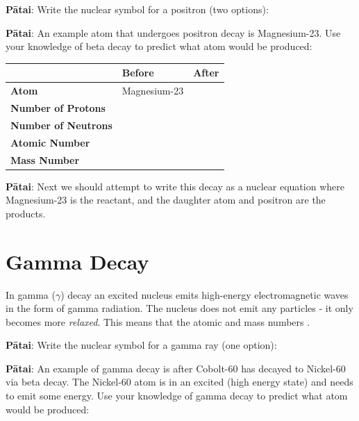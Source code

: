 \documentclass[12pt]{report}
\makeatletter
\DeclareRobustCommand{\fillinspace}[1]{%
\ifthenelse{\boolean{@answer}}{\textcolor{red}{#1}}{\phantom{#1}}%
}
\makeatother
\begin{document}
{\noindent\textbf{Pātai}: Write the nuclear symbol for a positron (two options):
\vspace{1.5cm}

\noindent\textbf{Pātai}: An example atom that undergoes positron decay is Magnesium-23. Use your knowledge of beta decay to predict what atom would be produced:

\begin{table}[ht]
\centering
\begin{tabular}{|l|p{3cm}|p{3cm}|}
\hline
                            & \textbf{Before} & \textbf{After} \\ \hline
\textbf{Atom}               & Magnesium-23    &                \\ \hline
\textbf{Number of Protons}  &                 &                \\ \hline
\textbf{Number of Neutrons} &                 &                \\ \hline
\textbf{Atomic Number}      &                 &                \\ \hline
\textbf{Mass Number}        &                 &                \\ \hline
\end{tabular}
\end{table}

\noindent\textbf{Pātai}: Next we should attempt to write this decay as a nuclear equation where Magnesium-23 is the reactant, and the daughter atom and positron are the products.
\vspace{1cm}

\section{Gamma Decay}
In gamma ($\gamma$) decay an excited nucleus emits high-energy electromagnetic waves in the form of gamma radiation. The nucleus does not emit any particles - it only becomes more \textit{relaxed}. This means that the atomic and mass numbers \fillinspace{stay the same}.

\noindent\textbf{Pātai}: Write the nuclear symbol for a gamma ray (one option):
\vspace{0.5cm}

\noindent\textbf{Pātai}: An example of gamma decay is after Cobolt-60 has decayed to Nickel-60 via beta decay. The Nickel-60 atom is in an excited (high energy state) and needs to emit some energy. Use your knowledge of gamma decay to predict what atom would be produced:

}
\end{document}
